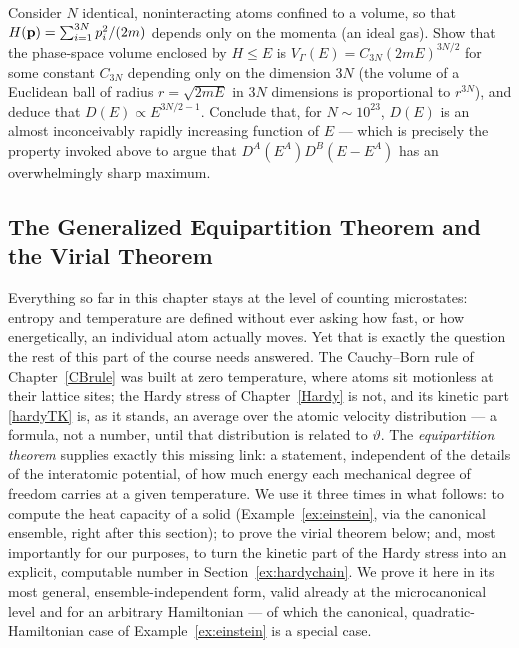 \begin{exercise}\label{ex:doscount}
	Consider $N$ identical, noninteracting atoms confined to a volume, so that $H(\mathbf{p}) = \sum_{i=1}^{3N}p_i^2/(2m)$ depends only on the momenta (an ideal gas). Show that the phase-space volume enclosed by $H\leq E$ is $V_\Gamma(E) = C_{3N}(2mE)^{3N/2}$ for some constant $C_{3N}$ depending only on the dimension $3N$ (the volume of a Euclidean ball of radius $r=\sqrt{2mE}$ in $3N$ dimensions is proportional to $r^{3N}$), and deduce that $D(E)\propto E^{3N/2-1}$. Conclude that, for $N\sim10^{23}$, $D(E)$ is an almost inconceivably rapidly increasing function of $E$ --- which is precisely the property invoked above to argue that $D^A(E^A)D^B(E-E^A)$ has an overwhelmingly sharp maximum.
\end{exercise}

\subsection*{The Generalized Equipartition Theorem and the Virial Theorem}

Everything so far in this chapter stays at the level of counting microstates: entropy and temperature are defined without ever asking how fast, or how energetically, an individual atom actually moves. Yet that is exactly the question the rest of this part of the course needs answered. The Cauchy--Born rule of Chapter~\ref{CBrule} was built at zero temperature, where atoms sit motionless at their lattice sites; the Hardy stress of Chapter~\ref{Hardy} is not, and its kinetic part \eqref{hardyTK} is, as it stands, an average over the atomic velocity distribution --- a formula, not a number, until that distribution is related to $\vartheta$. The \textit{equipartition theorem} supplies exactly this missing link: a statement, independent of the details of the interatomic potential, of how much energy each mechanical degree of freedom carries at a given temperature. We use it three times in what follows: to compute the heat capacity of a solid (Example~\ref{ex:einstein}, via the canonical ensemble, right after this section); to prove the virial theorem below; and, most importantly for our purposes, to turn the kinetic part of the Hardy stress into an explicit, computable number in Section~\ref{ex:hardychain}. We prove it here in its most general, ensemble-independent form, valid already at the microcanonical level and for an arbitrary Hamiltonian --- of which the canonical, quadratic-Hamiltonian case of Example~\ref{ex:einstein} is a special case.

